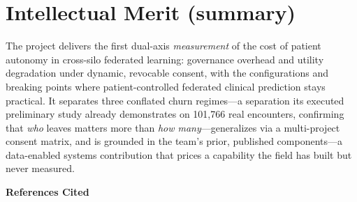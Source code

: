 \documentclass[11pt]{article}
\begin{document}
\section{Intellectual Merit (summary)}
The project delivers the first dual-axis \emph{measurement} of the cost of patient
autonomy in cross-silo federated learning: governance overhead and utility
degradation under dynamic, revocable consent, with the configurations and breaking
points where patient-controlled federated clinical prediction stays practical. It
separates
three conflated churn regimes---a separation its executed preliminary study
already demonstrates on 101{,}766 real encounters, confirming that \emph{who}
leaves matters more than \emph{how many}---generalizes via a multi-project
consent matrix, and
is grounded in the team's prior, published components---a data-enabled systems
contribution that prices a capability the field has built but never measured.

\newpage
\begin{center}\textbf{References Cited}\end{center}
\renewcommand{\refname}{}
\vspace{-2em}
{\small


}
\end{document}
